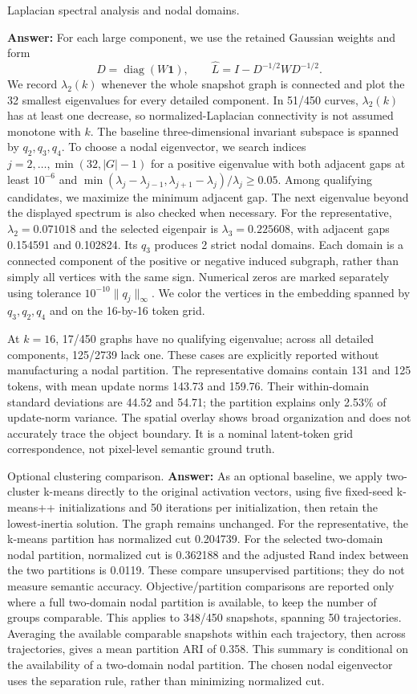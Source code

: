 \item Laplacian spectral analysis and nodal domains.
{\color{blue}\textbf{Answer:}
For each large component, we use the retained Gaussian weights and form
\[
D=\operatorname{diag}(W\mathbf{1}),\qquad
\widehat L=I-D^{-1/2}WD^{-1/2}.
\]
We record $\lambda_2(k)$ whenever the whole snapshot graph is connected and
plot the 32 smallest eigenvalues for every detailed component. In 51/450
curves, $\lambda_2(k)$ has at least one decrease, so normalized-Laplacian
connectivity is not assumed monotone with $k$.
The baseline three-dimensional invariant subspace is spanned by $q_2,q_3,q_4$.
To choose a nodal eigenvector, we search indices $j=2,\ldots,\min(32,|G|-1)$ for a positive
eigenvalue with both adjacent gaps at least $10^{-6}$ and
$\min(\lambda_j-\lambda_{j-1},\lambda_{j+1}-\lambda_j)/\lambda_j\ge0.05$.
Among qualifying candidates, we maximize the minimum adjacent gap. The next
eigenvalue beyond the displayed spectrum is also checked when necessary.
For the representative, $\lambda_2=0.071018$ and
the selected eigenpair is $\lambda_3=0.225608$,
with adjacent gaps 0.154591 and
0.102824.
Its $q_3$ produces 2 strict nodal domains.
Each domain is a connected component of the positive or negative induced
subgraph, rather than simply all vertices with the same sign. Numerical zeros
are marked separately using tolerance $10^{-10}\|q_j\|_\infty$.
We color the vertices in the embedding spanned by $q_3,q_2,q_4$ and on the
16-by-16 token grid.

At $k=16$, 17/450 graphs have no qualifying eigenvalue; across all detailed
components, 125/2739 lack one. These cases are explicitly reported
without manufacturing a nodal partition.
The representative domains contain 131 and 125 tokens,
with mean update norms 143.73 and
159.76. Their within-domain standard deviations
are 44.52 and 54.71;
the partition explains only 2.53\%
of update-norm variance. The spatial overlay shows broad organization and
does not accurately trace the object boundary. It is a nominal latent-token
grid correspondence, not pixel-level semantic ground truth.
}


\item Optional clustering comparison.
{\color{blue}\textbf{Answer:}
As an optional baseline, we apply two-cluster k-means directly to the
original activation vectors, using five fixed-seed k-means++ initializations
and 50 iterations per initialization, then retain the lowest-inertia solution.
The graph remains unchanged. For the representative, the k-means partition
has normalized cut 0.204739.
For the selected two-domain nodal partition, normalized cut is
0.362188 and the adjusted Rand index
between the two partitions is 0.0119.
These compare unsupervised partitions; they do not measure semantic accuracy.
Objective/partition comparisons are reported only where a full two-domain
nodal partition is available, to keep the number of groups comparable.
This applies to 348/450 snapshots, spanning
50 trajectories. Averaging the available comparable
snapshots within each trajectory, then across trajectories, gives a mean
partition ARI of 0.358. This summary is conditional on
the availability of a two-domain nodal partition. The chosen nodal eigenvector
uses the separation rule, rather than minimizing normalized cut.
}


